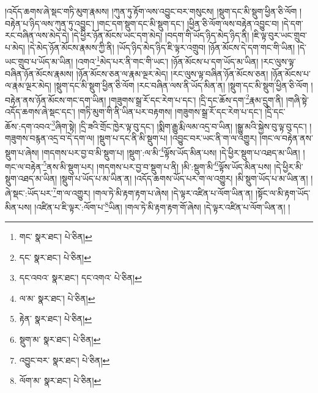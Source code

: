 །འདོད་ཆགས་ཞེ་སྡང་གཏི་མུག་རྣམས། །ཀུན་ཏུ་རྟོག་ལས་འབྱུང་བར་གསུངས། །སྡུག་དང་མི་སྡུག་ཕྱིན་ཅི་ལོག །བརྟེན་པ་ཉིད་ལས་ཀུན་ཏུ་འབྱུང་། །གང་དག་སྡུག་དང་མི་སྡུག་དང་། །ཕྱིན་ཅི་ལོག་ལས་བརྟེན་འབྱུང་བ། །དེ་དག་རང་བཞིན་ལས་མེད་དེ། །དེ་ཕྱིར་ཉོན་མོངས་ཡང་དག་མེད། །བདག་གི་ཡོད་ཉིད་མེད་ཉིད་ནི། །ཇི་ལྟ་བུར་ཡང་གྲུབ་པ་མེད། །དེ་མེད་ཉོན་མོངས་རྣམས་ཀྱི་ནི། །ཡོད་ཉིད་མེད་ཉིད་ཇི་ལྟར་འགྲུབ། །ཉོན་མོངས་དེ་དག་གང་གི་ཡིན། །དེ་ཡང་གྲུབ་པ་ཡོད་མ་ཡིན། །འགའ་\footnote{གང་  སྣར་ཐང་།  པེ་ཅིན། }མེད་པར་ནི་གང་གི་ཡང་། །ཉོན་མོངས་པ་དག་ཡོད་མ་ཡིན། །རང་ལུས་ལྟ་བཞིན་ཉོན་མོངས་རྣམས། །ཉོན་མོངས་ཅན་ལ་རྣམ་ལྔར་མེད། །རང་ལུས་ལྟ་བཞིན་ཉོན་མོངས་ཅན། །ཉོན་མོངས་པ་ལ་རྣམ་ལྔར་མེད། །སྡུག་དང་མི་སྡུག་ཕྱིན་ཅི་ལོག །རང་བཞིན་ལས་ནི་ཡོད་མིན་ན། །སྡུག་དང་མི་སྡུག་ཕྱིན་ཅི་ལོག །བརྟེན་ནས་ཉོན་མོངས་གང་དག་ཡིན། །གཟུགས་སྒྲ་རོ་དང་རེག་པ་དང་། །དྲི་དང་ཆོས་དག་\footnote{དང་  སྣར་ཐང་།  པེ་ཅིན། }རྣམ་དྲུག་ནི། །གཞི་སྟེ་འདོད་ཆགས་ཞེ་སྡང་དང་། །གཏི་མུག་གི་ནི་ཡིན་པར་བརྟགས། །གཟུགས་སྒྲ་རོ་དང་རེག་པ་དང་། །དྲི་དང་ཆོས་:དག་འབའ་\footnote{དང་འབའ་  སྣར་ཐང་། དང་འགའ་  པེ་ཅིན། }ཞིག་སྟེ། །དྲི་ཟའི་གྲོང་ཁྱེར་ལྟ་བུ་དང་། །སྨིག་རྒྱུ་རྨི་ལམ་འདྲ་བ་ཡིན། །སྒྱུ་མའི་སྐྱེས་བུ་ལྟ་བུ་དང་། །གཟུགས་བརྙན་འདྲ་བ་དེ་དག་ལ། །སྡུག་པ་དང་ནི་མི་སྡུག་པ། །འབྱུང་བར་ཡང་ནི་ག་ལ་འགྱུར། །གང་ལ་བརྟེན་ནས་སྡུག་པ་ཞེས། །གདགས་པར་བྱ་བ་མི་སྡུག་པ། །སྡུག་:ལ་མི་\footnote{ལ་མ་  སྣར་ཐང་།  པེ་ཅིན། }ལྟོས་ཡོད་མིན་པས། །དེ་ཕྱིར་སྡུག་པ་འཐད་མ་ཡིན། །གང་ལ་བརྟེན་\footnote{རྟེན་  སྣར་ཐང་།  པེ་ཅིན། }ནས་མི་སྡུག་པར། །གདགས་པར་བྱ་བ་སྡུག་པ་ནི། །མི་:སྡུག་མི་\footnote{སྡུག་མ་  སྣར་ཐང་།  པེ་ཅིན། }ལྟོས་ཡོད་མིན་པས། །དེ་ཕྱིར་མི་སྡུག་འཐད་མ་ཡིན། །སྡུག་པ་ཡོད་པ་མ་ཡིན་ན། །འདོད་ཆགས་ཡོད་པར་ག་ལ་འགྱུར། །མི་སྡུག་ཡོད་པ་མ་ཡིན་ན། །ཞེ་སྡང་:ཡོད་པར་\footnote{འབྱུང་བར་  སྣར་ཐང་།  པེ་ཅིན། }ག་ལ་འགྱུར། །གལ་ཏེ་མི་རྟག་རྟག་པ་ཞེས། །དེ་ལྟར་འཛིན་པ་ལོག་ཡིན་ན། །སྟོང་ལ་མི་རྟག་ཡོད་མིན་པས། །འཛིན་པ་ཇི་ལྟར་:ལོག་པ་\footnote{ལོག་མ་  སྣར་ཐང་།  པེ་ཅིན། }ཡིན། །གལ་ཏེ་མི་རྟག་རྟག་གོ་ཞེས། །དེ་ལྟར་འཛིན་པ་ལོག་ཡིན་ན། །
